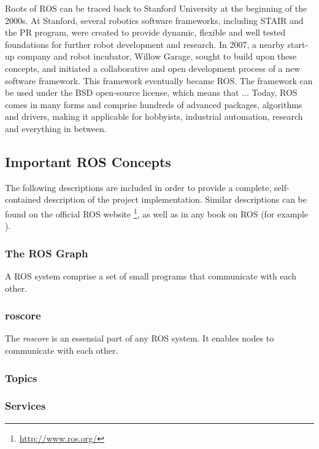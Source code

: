 Roots of \ac{ROS} can be traced back to Stanford University at the beginning of the 2000s. At Stanford, several robotics software frameworks, including \ac{STAIR} and the \ac{PR} program, were created to provide dynamic, flexible and well tested foundations for further robot development and research. In 2007, a nearby start-up company and robot incubator, Willow Garage, sought to build upon these concepts, and initiated a collaborative and open development process of a new software framework. This framework eventually became \ac{ROS}\cite{ROS_history}\cite{rosbook15}. The framework can be used under the BSD open-source license, which means that ...\cite{BCD_license} Today, \ac{ROS} comes in many forms and comprise hundreds of advanced packages, algorithms and drivers, making it applicable for hobbyists, industrial automation, research and everything in between. 

\subsection{Important ROS Concepts}

The following descriptions are included in order to provide a complete, self-contained description of the project implementation. Similar descriptions can be found on the official \ac{ROS} website \footnote{\url{http://www.ros.org/}}, as well as in any book on \ac{ROS} (for example \cite{rosbook15}). 

\subsubsection{The ROS Graph}

A \ac{ROS} system comprise a set of small programs that communicate with each other. 

\subsubsection{roscore}

The \textit{roscore} is an essensial part of any \ac{ROS} system. It enables nodes to communicate with each other.

\subsubsection{Topics}

\subsubsection{Services}

